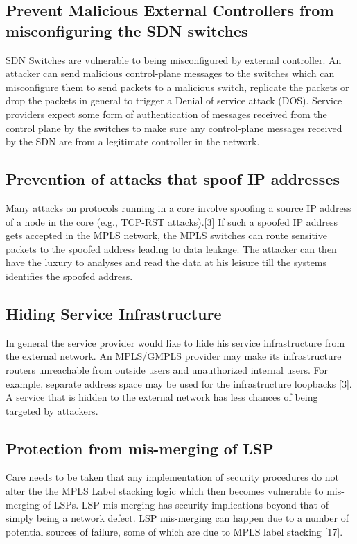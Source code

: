 \subsection*{Prevent Malicious External Controllers from misconfiguring the SDN switches}
SDN Switches are vulnerable to being misconfigured by external controller. An attacker can send malicious control-plane messages to the switches which can misconfigure them to send packets to a malicious switch, replicate the packets or drop the packets in general to trigger a Denial of service attack (DOS). Service providers expect some form of authentication of messages received from the control plane by the switches to make sure any control-plane messages received by the SDN are from a legitimate controller in the network.

\subsection*{Prevention of attacks that spoof IP addresses}
Many attacks on protocols running in a core involve spoofing a source IP address of a node in the core (e.g., TCP-RST attacks).[3] If such a spoofed IP address gets accepted in the MPLS network, the MPLS switches can route sensitive packets to the spoofed address leading to data leakage. The attacker can then have the luxury to analyses and read the data at his leisure till the systems identifies the spoofed address.

\subsection*{Hiding Service Infrastructure}
In general the service provider would like to hide his service infrastructure from the external network. An MPLS/GMPLS provider may make its infrastructure routers unreachable from outside users and unauthorized internal users. For example, separate address space may be used for the infrastructure loopbacks [3]. A service that is hidden to the external network has less chances of being targeted by attackers.

\subsection*{Protection from mis-merging of LSP}
Care needs to be taken that any implementation of security procedures do not alter the the MPLS Label stacking logic which then becomes vulnerable to mis-merging of LSPs. LSP mis-merging has security implications beyond that of simply being a network defect. LSP mis-merging can happen due to a number of potential sources of failure, some of which are due to MPLS label stacking [17].

